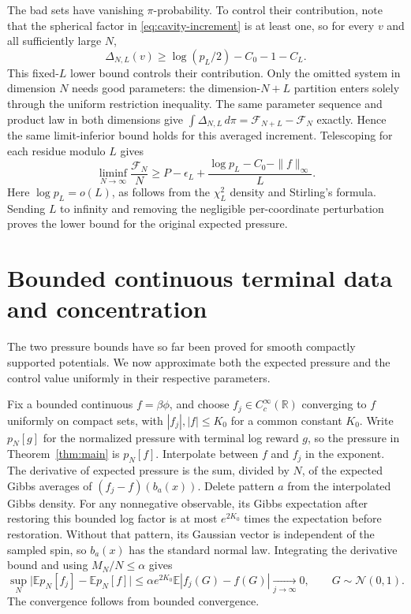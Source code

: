 \documentclass[11pt]{article}
\newcommand{\R}{\mathbb R}
\newcommand{\E}{\mathbb E}
\begin{document}
The bad sets have vanishing $\pi$-probability. To control their contribution, note that the spherical factor
in \eqref{eq:cavity-increment} is at least one, so for every $v$ and all sufficiently large $N$,
\[
 \Delta_{N,L}(v)\ge\log(p_L/2)-C_0-1-C_L.
\]
This fixed-$L$ lower bound controls their contribution. Only the omitted system
in dimension $N$ needs good parameters: the dimension-$N+L$ partition enters
solely through the uniform restriction inequality. The same parameter sequence
and product law in both dimensions give
$\int\Delta_{N,L}\,d\pi=\mathcal F_{N+L}-\mathcal F_N$ exactly. Hence the same
limit-inferior bound holds for this averaged increment. Telescoping for each
residue modulo $L$ gives
\[
 \liminf_{N\to\infty}\frac{\mathcal F_N}{N}
 \ge P-\epsilon_L+
       \frac{\log p_L-C_0-\|f\|_\infty}{L}.
\]
Here $\log p_L=o(L)$, as follows from the $\chi^2_L$ density and Stirling's
formula. Sending $L$ to infinity and removing the negligible per-coordinate
perturbation proves the lower bound for the original expected pressure.

\section{Bounded continuous terminal data and concentration}\label{sec:completion}

The two pressure bounds have so far been proved for smooth compactly supported
potentials. We now approximate both the expected pressure and the control value
uniformly in their respective parameters.

Fix a bounded continuous $f=\beta\phi$, and choose $f_j\in C_c^\infty(\R)$
converging to $f$ uniformly on compact sets, with $|f_j|,|f|\le K_0$ for a
common constant $K_0$. Write $p_N[g]$ for the normalized pressure with terminal
log reward $g$, so the pressure in Theorem~\ref{thm:main} is $p_N[f]$.
Interpolate between $f$ and $f_j$ in the exponent. The derivative of expected
pressure is the sum, divided by $N$, of the expected Gibbs averages of
$(f_j-f)(b_a(x))$. Delete pattern $a$ from the interpolated Gibbs density.
For any nonnegative observable, its Gibbs expectation after restoring this
bounded log factor is at most $e^{2K_0}$ times the expectation before restoration.
Without that pattern, its Gaussian vector is
independent of the sampled spin, so $b_a(x)$ has the standard normal law.
Integrating the derivative bound and using $M_N/N\le\alpha$ gives
\[
 \sup_N\big|\E p_N[f_j]-\E p_N[f]\big|
 \le \alpha e^{2K_0}\E|f_j(G)-f(G)|
 \xrightarrow[j\to\infty]{}0,
 \qquad G\sim\mathcal N(0,1).
\]
The convergence follows from bounded convergence.
\end{document}
